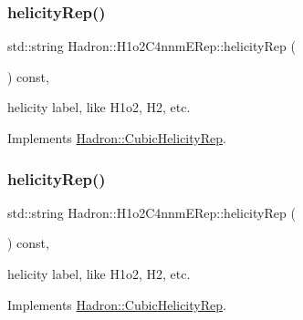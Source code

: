 \mbox{\label{structHadron_1_1H1o2C4nnmERep_aa76e66e21088a552789c67e12cb4b72e}} 
\subsubsection{\texorpdfstring{helicityRep()}{helicityRep()}\hspace{0.1cm}{\footnotesize\ttfamily [1/3]}}
{\footnotesize\ttfamily std\+::string Hadron\+::\+H1o2\+C4nnm\+E\+Rep\+::helicity\+Rep (\begin{DoxyParamCaption}{ }\end{DoxyParamCaption}) const\hspace{0.3cm}{\ttfamily [inline]}, {\ttfamily [virtual]}}

helicity label, like H1o2, H2, etc. 

Implements \mbox{\hyperlink{structHadron_1_1CubicHelicityRep_af1096946b7470edf0a55451cc662f231}{Hadron\+::\+Cubic\+Helicity\+Rep}}.

\mbox{\label{structHadron_1_1H1o2C4nnmERep_aa76e66e21088a552789c67e12cb4b72e}} 
\subsubsection{\texorpdfstring{helicityRep()}{helicityRep()}\hspace{0.1cm}{\footnotesize\ttfamily [2/3]}}
{\footnotesize\ttfamily std\+::string Hadron\+::\+H1o2\+C4nnm\+E\+Rep\+::helicity\+Rep (\begin{DoxyParamCaption}{ }\end{DoxyParamCaption}) const\hspace{0.3cm}{\ttfamily [inline]}, {\ttfamily [virtual]}}

helicity label, like H1o2, H2, etc. 

Implements \mbox{\hyperlink{structHadron_1_1CubicHelicityRep_af1096946b7470edf0a55451cc662f231}{Hadron\+::\+Cubic\+Helicity\+Rep}}.

\mbox{\label{structHadron_1_1H1o2C4nnmERep_aa76e66e21088a552789c67e12cb4b72e}} 
